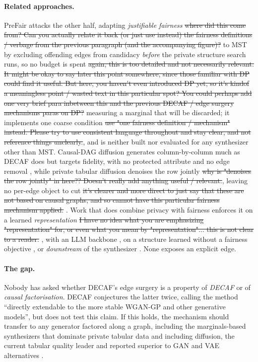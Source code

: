 \documentclass{article}
\begin{document}
\paragraph{Related approaches.}
PreFair \citep{pujol2023prefair} attacks the other half, adapting
\emph{justifiable fairness} \st{where did this come from? Can you actually relate it back (or just use instead) the fairness definitions / verbage from the previous paragraph (and the accompanying figure)?} to MST \citep{mckenna2021mst} by excluding offending
edges from candidacy \emph{before} the private structure search runs, so no budget
is spent \st{again, this is too detailed and not necessarily relevant. It might be okay to say later this point somewhere, since those familiar with DP could find it useful.  But here, you haven't even introduced DP yet, so it's kindof a meaningless point / wasted text in this particular spot? You could perhaps add one very brief para inbetween this and the previous DECAF / edge surgery mechanisms paras on DP?} measuring a marginal that will be discarded; it implements one coarse
condition \st{use "one fairness definition / mechanism" instead. Please try to use consistent language throughout and stay clear, and not reference things unclearly.}, and is neither built nor evaluated for any synthesizer other than MST.
Causal-DAG diffusion generates column-by-column much as DECAF does but targets
fidelity, with no protected attribute and no edge removal
\citep{zhang2025causaldifftab,jacob2026tabscm}, while private tabular diffusion
denoises the row jointly \st{why is "denoises the row jointly" in here?? Doesn't really add anything useful / relevant.}, leaving no per-edge object to cut \st{it's clearer and more direct to just say that these are not based on causal graphs, and so cannot have this particular fairness mechanism applied.} \citep{zhu2024dptldm}.
Work that does combine privacy with fairness enforces it on a learned
\emph{representation} \st{I have no idea what you are emphasizing "representation" for, or even what you mean by "representation"... this is not clear to a reader.} \citep{hyrup2025flip,sarmin2025pfwgan}, with an LLM backbone
\citep{nagesh2025faircausesyn}, on a structure learned without a fairness
objective \citep{jia2025pradagan}, or \emph{downstream} of the synthesizer
\citep{angelozzi2026where}. None exposes an explicit edge.

\paragraph{The gap.}
Nobody has asked whether DECAF's edge surgery is a property of \emph{DECAF} or of
\emph{causal factorisation}. DECAF conjectures the latter twice, calling the
method ``directly
extendable to the more stable WGAN-GP \citep{gulrajani2017wgangp} and other
generative models'', but does not test this claim. If this holds, the mechanism should transfer to any generator
factored along a graph, including the marginals-based synthesizers that dominate
private tabular data \citep{mckenna2021mst,zhang2014privbayes,zhang2021privsyn,
mckenna2022aim} and including diffusion, the current tabular quality leader and
reported superior to GAN and VAE alternatives \citep{kotelnikov2023tabddpm}.
\end{document}
